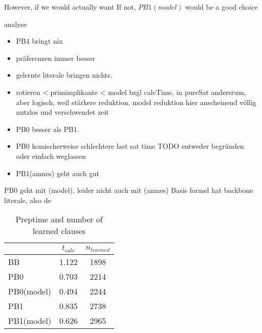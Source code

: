 However, if we would actually want 
If not, $PB1(model)$ would be a good choice

analyse
\begin{itemize}
\item PB4 bringt nix
\item präferenzen immer besser
\item gelernte literale bringen nichts.
\item rotieren < primimplikante < model bzgl calcTime, in pureSat andersrum, aber logisch, weil stärkere reduktion. model reduktion hier anscheinend völlig nutzlos und verschwendet zeit
\item PB0 besser als PB1. 
\item PB0 komischerweise schlechtere last sat time TODO entweder begründen oder einfach weglassen
\item PB1(amnes) geht auch gut
\end{itemize}
PB0 geht mit (model), leider nicht auch mit (amnes)
Basis formel hat backbone literale, also de


\begin{wraptable}{R}{6cm}
\begin{tabular}{l| c c}
& $t_{calc}$& $n_{learned}$\\
\hline
BB & 1.122 & 1898 \\
PB0 & 0.703 & 2214 \\
PB0(model) & 0.494 & 2244 \\
PB1 & 0.835 & 2738 \\
PB1(model) & 0.626 & 2965 \\
\end{tabular}
\caption{Preptime and number of learned clauses}
\end{wraptable}



